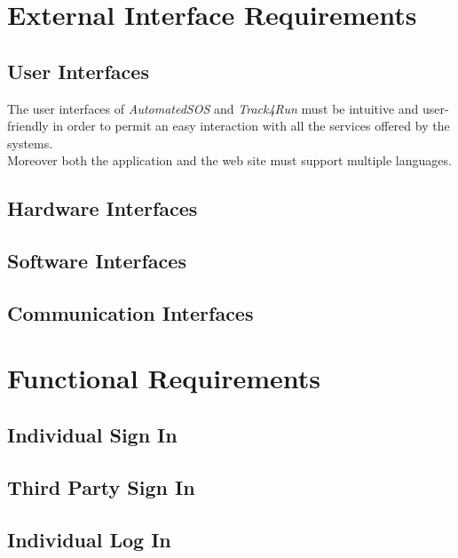 \section{External Interface Requirements}

\subsection{User Interfaces}
The user interfaces of \textit{AutomatedSOS} and \textit{Track4Run} must be intuitive and user-friendly in order to permit an easy interaction with all the services offered by the systems.\\
Moreover both the application and the web site must support multiple languages.

\subsection{Hardware Interfaces}

\subsection{Software Interfaces}

\subsection{Communication Interfaces}

\clearpage
\section{Functional Requirements}

\subsection{Individual Sign In}\label{individualLogIn}

\clearpage

\subsection{Third Party Sign In}

\clearpage

\subsection{Individual Log In}

\clearpage

